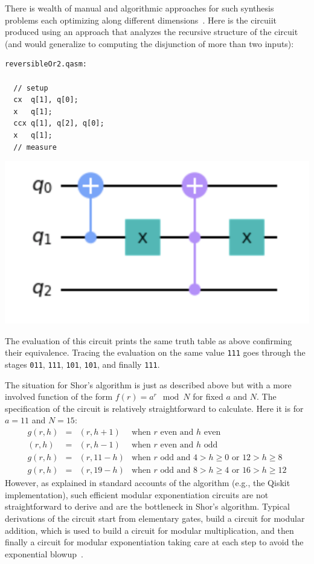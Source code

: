 There is wealth of manual and algorithmic approaches for such synthesis problems each optimizing along  different dimensions~\cite{XXX}. Here is the circuiit produced using an approach that analyzes the recursive structure of the circuit (and would generalize to computing the disjunction of more than two inputs):

\begin{center}
  \begin{minipage}[c]{0.4\linewidth}
\begin{verbatim}
reversibleOr2.qasm:

  // setup
  cx  q[1], q[0];
  x   q[1];
  ccx q[1], q[2], q[0];
  x   q[1];
  // measure
  \end{verbatim}
  \end{minipage}
  \qquad
  \includegraphics[scale=0.7]{reversibleOr2.png}
\end{center}

The evaluation of this circuit prints the same truth table as above confirming their equivalence. Tracing the evaluation on the same value \verb|111| goes through the stages \verb|011|, \verb|111|, \verb|101|, \verb|101|, and finally \verb|111|.

The situation for Shor's algorithm is just as described above but with a more involved function of the form $f(r) = a^{r} \mod N$ for fixed $a$ and $N$. The specification of the circuit is relatively straightforward to calculate. Here it is for $a=11$ and $N=15$:
\[\begin{array}{rcll}
g(r,h) &=& (r,h+1) & \mbox{when~$r$~even~and~$h$~even} \\
(r,h) &=& (r,h-1) & \mbox{when~$r$~even~and~$h$~odd} \\
g(r,h) &=& (r,11-h) & \mbox{when~$r$~odd~and~$4 > h \geq 0$~or~$12 > h \geq 8$} \\
g(r,h) &=& (r,19-h) & \mbox{when~$r$~odd~and~$8 > h \geq 4$~or~$16 > h \geq 12$}
\end{array}\]
However, as explained in standard accounts of the algorithm (e.g., the Qiskit implementation), such efficient modular exponentiation circuits are not straightforward to derive and are the bottleneck in Shor’s algorithm. Typical derivations of the circuit start from elementary gates, build a circuit for modular addition, which is used to build a circuit for modular multiplication, and then finally a circuit for modular exponentiation taking care at each step to avoid the exponential blowup~\cite{shorefficient}.

